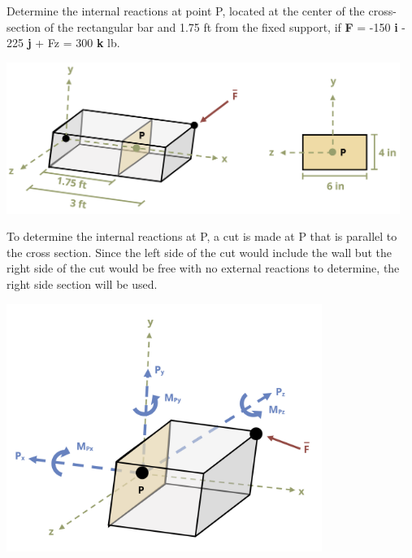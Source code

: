 \documentclass[
  letterpaper,
  DIV=11,
  numbers=noendperiod]{scrreprt}
\begin{document}
\begin{tcolorbox}[enhanced jigsaw, colback=white, colframe=quarto-callout-note-color-frame, leftrule=.75mm, opacitybacktitle=0.6, colbacktitle=quarto-callout-note-color!10!white, arc=.35mm, bottomrule=.15mm, breakable, title={Example 1.6}, left=2mm, titlerule=0mm, toptitle=1mm, toprule=.15mm, opacityback=0, rightrule=.15mm, coltitle=black, bottomtitle=1mm]

Determine the internal reactions at point P, located at the center of
the cross-section of the rectangular bar and 1.75 ft from the fixed
support, if \textbf{F} = -150 \textbf{i} - 225 \textbf{j} + Fz = 300
\textbf{k} lb.

\begin{center}
\includegraphics[width=5.04167in,height=\textheight]{images/CH1 PNGs/example 1.6 part 1.png}
\end{center}

To determine the internal reactions at P, a cut is made at P that is
parallel to the cross section. Since the left side of the cut would
include the wall but the right side of the cut would be free with no
external reactions to determine, the right side section will be used.

\begin{center}
\includegraphics[width=4.04167in,height=\textheight]{images/CH1 PNGs/example 1.6 part 2.png}
\end{center}


\end{tcolorbox}
\end{document}
